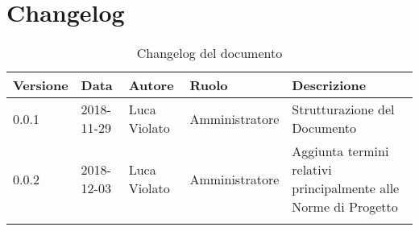 \section{Changelog}

\begin{center}
\begin{longtable}[c]{|m{}|m{}|m{}|m{}|p{}|}
\hline
\textbf{Versione} & \textbf{Data} & \textbf{Autore} & \textbf{Ruolo} & \textbf{Descrizione} \\
\hline \hline
\endfirsthead
0.0.1 & 2018-11-29 & Luca Violato & Amministratore & Strutturazione del Documento \\
\hline
0.0.2 & 2018-12-03 & Luca Violato & Amministratore & Aggiunta termini relativi principalmente alle Norme di Progetto \\
\hline
\caption{Changelog del documento}
\end{longtable}
\end{center}
